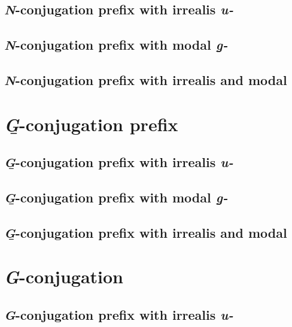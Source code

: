 \documentclass[12pt,letterpaper,landscape,oneside,article]{memoir}
\begin{document}
\subsection{\textit{N}-conjugation prefix with irrealis \textit{u-}}

\subsection{\textit{N}-conjugation prefix with modal \textit{g̱-}}

\subsection{\textit{N}-conjugation prefix with irrealis and modal}

\clearpage
\section{\textit{G̱}-conjugation prefix}

\subsection{\textit{G̱}-conjugation prefix with irrealis \textit{u-}}

\subsection{\textit{G̱}-conjugation prefix with modal \textit{g̱-}}

\subsection{\textit{G̱}-conjugation prefix with irrealis and modal}

\clearpage
\section{\textit{G}-conjugation}

\subsection{\textit{G}-conjugation prefix with irrealis \textit{u-}}
\end{document}
